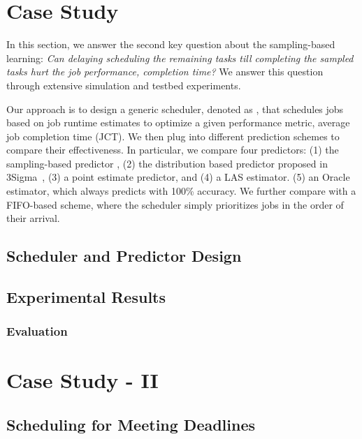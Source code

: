 \section{Case Study}
\label{sec:study}

In this section, we answer the second key question about the sampling-based
learning: {\em Can delaying scheduling the
remaining tasks till completing the sampled tasks hurt the
job performance, \eg completion time?
}
We answer this question through extensive simulation and testbed experiments.

Our approach is to design a generic scheduler, denoted as \gs, that schedules
jobs based on job runtime estimates to optimize a given performance metric, \eg
average job completion time (JCT).  We then plug into \gs different
prediction schemes to compare their effectiveness.
\rm{In particular, we compare four predictors:
(1) the sampling-based predictor \slearn,
(2) the distribution based predictor proposed in 3Sigma~\cite{3Sigma},
(3) a point estimate predictor,
and
(4) a LAS estimator.
(5) an Oracle estimator, which always predicts with 100\% accuracy.
We further compare with a FIFO-based scheme, where the scheduler
simply prioritizes jobs in the order of their arrival.
}


\subsection{Scheduler and Predictor Design}
\label{sec:study:design}


\subsection{Experimental Results}
\label{sec:study:sim}


\subsubsection{Evaluation}
\label{sec:study:testbed}

\fi

\section{Case Study - II}
\label{sec:study2}

\subsection{Scheduling for Meeting Deadlines}
\label{sec:study2:design}
\fi
%
